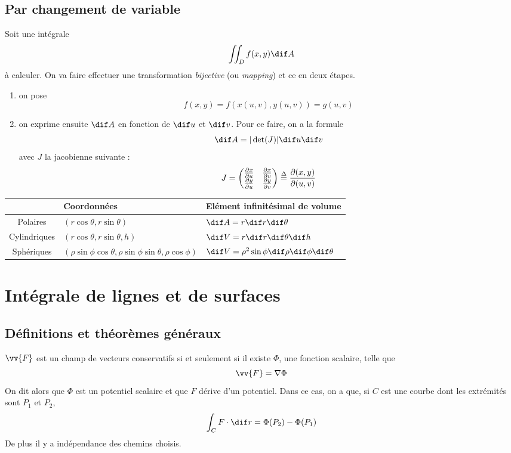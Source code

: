 \subsection{Par changement de variable}
Soit une intégrale
\[ \iint_D f(x,y) \dif A \]
à calculer. On va faire effectuer une transformation \emph{bijective} (ou \emph{mapping}) et ce en deux étapes.
\begin{enumerate}
	\item on pose
		\[ f(x,y) = f(x(u,v),y(u,v)) = g(u,v) \]
	\item on exprime ensuite $\dif A$ en fonction de $\dif u$ et $\dif v$. Pour ce faire, on a la formule
		\[ \dif A = |\newdet(J)| \dif u \dif v \]
		avec $J$ la jacobienne suivante :
		\[ J =
		\begin{pmatrix}
			\frac{\partial x}{\partial u} & \frac{\partial x}{\partial v} \\ \frac{\partial y}{\partial u} & \frac{\partial y}{\partial v}
		\end{pmatrix}
		\overset{\Delta}{=} \frac{\partial(x,y)}{\partial (u,v)} \]
\end{enumerate}

\begin{table}[!ht]
	\centering
	\begin{tabular}{c|l|l}
	& Coordonnées & Elément infinitésimal de volume \\
	\hline
	Polaires & $(r\cos \theta, r\sin \theta)$ & $\dif A = r \dif r \dif \theta$ \\
	\hline
	Cylindriques & $(r\cos \theta, r\sin \theta, h)$ & $\dif V = r \dif r \dif \theta \dif h$ \\
	\hline
	Sphériques & $(\rho \sin \phi \cos \theta, \rho \sin \phi \sin \theta, \rho \cos \phi)$
	& $\dif V = \rho^2 \sin \phi \dif\rho \dif\phi \dif\theta$
	\end{tabular}
\end{table}

\section{Intégrale de lignes et de surfaces}

\subsection{Définitions et théorèmes généraux}

\begin{mydef} $\vv{F}$ est un champ de vecteurs conservatifs si et seulement si il existe $\Phi$, une fonction scalaire, telle que
	\[ \vv{F} = \nabla \Phi \]
	On dit alors que $\Phi$ est un potentiel scalaire et que $F$ dérive d'un potentiel.
	Dans ce cas, on a que, si $C$ est une courbe dont les extrémités sont $P_1$ et $P_2$,
	\[ \int_C F \cdot \dif r = \Phi(P_2) - \Phi(P_1) \]
	De plus il y a indépendance des chemins choisis.
\end{mydef}

